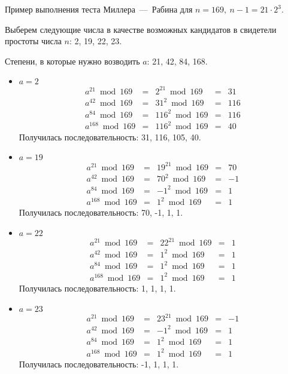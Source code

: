 \example
Пример выполнения теста Миллера~---~Рабина для $n = 169, ~ n-1 = 21 \cdot 2^3$.

Выберем следующие числа в качестве возможных кандидатов в свидетели простоты числа $n$: 2, 19, 22, 23.

Степени, в которые нужно возводить $a$: 21, 42, 84, 168.

\begin{itemize}
    \item $a = 2$
        \[\begin{matrix}
        a^{21} \bmod 169 & = & 2^{21} \bmod 169 & = & 31 \\ 
        a^{42} \bmod 169 & = & 31^2 \bmod 169 & = & 116 \\ 
        a^{84} \bmod 169 & = & 116^2 \bmod 169 & = & 116 \\ 
        a^{168} \bmod 169 & = & 116^2 \bmod 169 & = & 40
        \end{matrix}\]
    Получилась последовательность: 31, 116, 105, 40.
    \item $a = 19$
        \[\begin{matrix}
        a^{21} \bmod 169 & = & 19^{21} \bmod 169 & = & 70 \\ 
        a^{42} \bmod 169 & = & 70^2 \bmod 169 & = & -1 \\ 
        a^{84} \bmod 169 & = & -1^2 \bmod 169 & = & 1 \\ 
        a^{168} \bmod 169 & = & 1^2 \bmod 169 & = & 1
        \end{matrix}\]
    Получилась последовательность: 70, -1, 1, 1.
    \item $a = 22$
        \[\begin{matrix}
        a^{21} \bmod 169 & = & 22^{21} \bmod 169 & = & 1 \\ 
        a^{42} \bmod 169 & = & 1^2 \bmod 169 & = & 1 \\ 
        a^{84} \bmod 169 & = & 1^2 \bmod 169 & = & 1 \\ 
        a^{168} \bmod 169 & = & 1^2 \bmod 169 & = & 1
        \end{matrix}\]
    Получилась последовательность: 1, 1, 1, 1.
    \item $a = 23$
        \[\begin{matrix}
        a^{21} \bmod 169 & = & 23^{21} \bmod 169 & = & -1 \\ 
        a^{42} \bmod 169 & = & -1^2 \bmod 169 & = & 1 \\ 
        a^{84} \bmod 169 & = & 1^2 \bmod 169 & = & 1 \\ 
        a^{168} \bmod 169 & = & 1^2 \bmod 169 & = & 1
        \end{matrix}\]
    Получилась последовательность: -1, 1, 1, 1.
\end{itemize}

